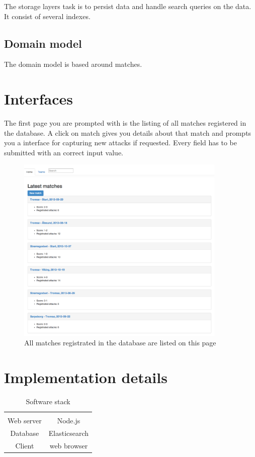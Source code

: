 The storage layers task is to persist data and handle search queries on the data. It consist of several indexes. 

\subsection{Domain model}

The domain model is based around matches.



\section{Interfaces}

The first page you are prompted with is the listing of all matches registered in the database. A click on match gives you details about that match and prompts you a interface for capturing new attacks if requested. Every field has to be submitted with an correct input value.

\begin{figure}[ht!]
\centering
\includegraphics[width=100mm]{images/general/all_matches.png}
\caption{All matches registrated in the database are listed on this page}
\label{overflow}
\end{figure}





\section{Implementation details}

\begin{table}[ht]
\caption{Software stack}
\begin{center}
\begin{tabular}{c|c}
    \hline
    \multicolumn{2}{c}{}\\
    Web server& Node.js\\
    Database& Elasticsearch\\
    Client & web  browser \\
\hline
\end{tabular}
\end{center}
\label{tab:multicol}
\end{table}


